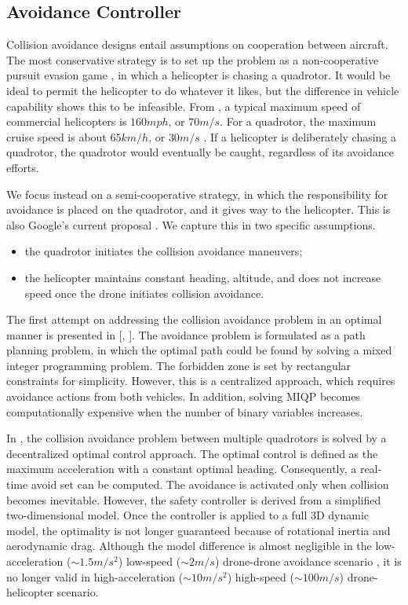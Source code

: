 \documentclass[journal,11pt,onecolumn,draftclsnofoot,]{IEEEtran}
\begin{document}
\subsection{Avoidance Controller}

Collision avoidance designs entail assumptions on cooperation between aircraft. The most conservative strategy is to set up the problem as a non-cooperative pursuit evasion game \cite{lygeros1999controllers}, in which a helicopter is chasing a quadrotor. It would be ideal to permit the helicopter to do whatever it likes, but the difference in vehicle capability shows this to be infeasible. From \cite{helicopter_common_speed}, a typical maximum speed of commercial helicopters is $160mph$, or $70m/s$. For a quadrotor, the maximum cruise speed is about $65km/h$, or $30m/s$ \cite{quadrotor_common_speed}. If a helicopter is deliberately chasing a quadrotor, the quadrotor would eventually be caught, regardless of its avoidance efforts. 

We focus instead on a semi-cooperative strategy, in which the responsibility for avoidance is placed on the quadrotor, and it gives way to the helicopter. This is also Google's current proposal \cite{google_airspace_system}. We capture this in two specific assumptions.

\begin{itemize}
	\item the quadrotor initiates the collision avoidance maneuvers;
	\item the helicopter maintains constant heading, altitude, and does not increase speed once the drone initiates collision avoidance.
\end{itemize}

The first attempt on addressing the collision avoidance problem in an optimal manner is presented in [, ]. The avoidance problem is formulated as a path planning problem, in which the optimal path could be found by solving a mixed integer programming problem. The forbidden zone is set by rectangular constraints for simplicity. However, this is a centralized approach, which requires avoidance actions from both vehicles. In addition, solving MIQP becomes computationally expensive when the number of binary variables increases.

In \cite{hoffmann2008decentralized}, the collision avoidance problem between multiple quadrotors is solved by a decentralized optimal control approach. The optimal control is defined as the maximum acceleration with a constant optimal heading. Consequently, a real-time avoid set can be computed. The avoidance is activated only when collision becomes inevitable. However, the safety controller is derived from a simplified two-dimensional model. Once the controller is applied to a full 3D dynamic model, the optimality is not longer guaranteed because of rotational inertia and aerodynamic drag. Although the model difference is almost negligible in the low-acceleration ($\sim 1.5m/s^2$) low-speed ($\sim 2 m/s$) drone-drone avoidance scenario \cite{hoffmann2008decentralized}, it is no longer valid in high-acceleration ($\sim 10m/s^2$) high-speed ($\sim 100 m/s$) drone-helicopter scenario. 
\end{document}
